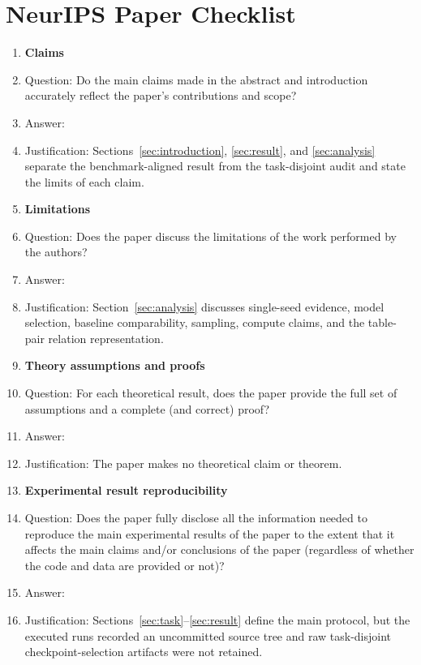 \section*{NeurIPS Paper Checklist}

\begin{enumerate}
\item \textbf{Claims}
  \item[] Question: Do the main claims made in the abstract and introduction accurately reflect the paper's contributions and scope?
  \item[] Answer: \answerYes{}
  \item[] Justification: Sections~\ref{sec:introduction}, \ref{sec:result}, and
  \ref{sec:analysis} separate the benchmark-aligned result from the
  task-disjoint audit and state the limits of each claim.

\item \textbf{Limitations}
  \item[] Question: Does the paper discuss the limitations of the work performed by the authors?
  \item[] Answer: \answerYes{}
  \item[] Justification: Section~\ref{sec:analysis} discusses single-seed
  evidence, model selection, baseline comparability, sampling, compute claims,
  and the table-pair relation representation.

\item \textbf{Theory assumptions and proofs}
  \item[] Question: For each theoretical result, does the paper provide the full set of assumptions and a complete (and correct) proof?
  \item[] Answer: \answerNA{}
  \item[] Justification: The paper makes no theoretical claim or theorem.

\item \textbf{Experimental result reproducibility}
  \item[] Question: Does the paper fully disclose all the information needed to reproduce the main experimental results of the paper to the extent that it affects the main claims and/or conclusions of the paper (regardless of whether the code and data are provided or not)?
  \item[] Answer: \answerNo{}
  \item[] Justification: Sections~\ref{sec:task}--\ref{sec:result} define the
  main protocol, but the executed runs recorded an uncommitted source tree and
  raw task-disjoint checkpoint-selection artifacts were not retained.


\end{enumerate}
